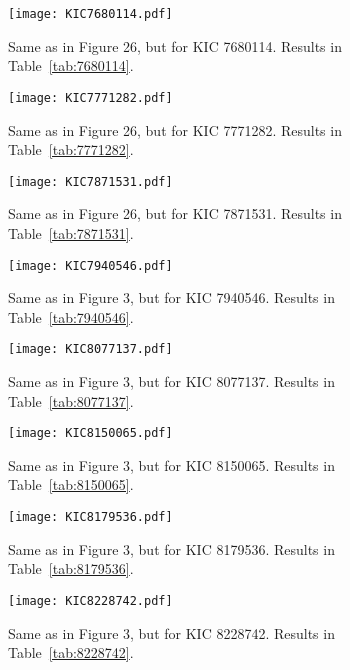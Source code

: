 \documentclass[twocolumn]{aastex61}%
\begin{document}
\begin{figure}[ht]
\texttt{[image: KIC7680114.pdf]}
\caption{Same as in Figure 26, but for KIC 7680114. Results in Table~\ref{tab:7680114}.}\label{fig:7680114}
\end{figure}

\FloatBarrier
\nopagebreak
\begin{figure}[ht]
\texttt{[image: KIC7771282.pdf]}
\caption{Same as in Figure 26, but for KIC 7771282. Results in Table~\ref{tab:7771282}.}\label{fig:7771282}
\end{figure}

\begin{figure}[ht]
\texttt{[image: KIC7871531.pdf]}
\caption{Same as in Figure 26, but for KIC 7871531. Results in Table~\ref{tab:7871531}.}\label{fig:7871531}
\end{figure}

\begin{figure}[ht]
\texttt{[image: KIC7940546.pdf]}
\caption{Same as in Figure 3, but for KIC 7940546. Results in Table~\ref{tab:7940546}.}\label{fig:7940546}
\end{figure}

\begin{figure}[ht]
\texttt{[image: KIC8077137.pdf]}\vspace{-0.2cm}
\caption{Same as in Figure 3, but for KIC 8077137. Results in Table~\ref{tab:8077137}.}\label{fig:8077137}
\end{figure}

\begin{figure}[ht]
\texttt{[image: KIC8150065.pdf]}\vspace{-0.2cm}
\caption{Same as in Figure 3, but for KIC 8150065. Results in Table~\ref{tab:8150065}.}\label{fig:8150065}\vspace{-1.5cm}
\end{figure}

\begin{figure}[ht]
\texttt{[image: KIC8179536.pdf]}
\caption{Same as in Figure 3, but for KIC 8179536. Results in Table~\ref{tab:8179536}.}\label{fig:8179536}
\end{figure}

\begin{figure}[ht]
\texttt{[image: KIC8228742.pdf]}
\caption{Same as in Figure 3, but for KIC 8228742. Results in Table~\ref{tab:8228742}.}\label{fig:8228742}
\end{figure}
\end{document}
